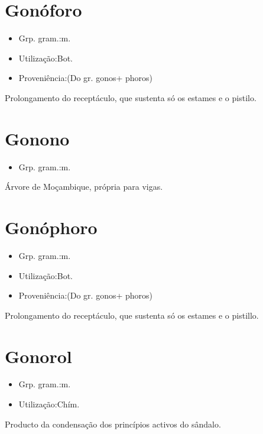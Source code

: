 \section{Gonóforo}
\begin{itemize}
\item {Grp. gram.:m.}
\end{itemize}
\begin{itemize}
\item {Utilização:Bot.}
\end{itemize}
\begin{itemize}
\item {Proveniência:(Do gr. \textunderscore gonos\textunderscore  + \textunderscore phoros\textunderscore )}
\end{itemize}
Prolongamento do receptáculo, que sustenta só os estames e o pistilo.
\section{Gonono}
\begin{itemize}
\item {Grp. gram.:m.}
\end{itemize}
Árvore de Moçambique, própria para vigas.
\section{Gonóphoro}
\begin{itemize}
\item {Grp. gram.:m.}
\end{itemize}
\begin{itemize}
\item {Utilização:Bot.}
\end{itemize}
\begin{itemize}
\item {Proveniência:(Do gr. \textunderscore gonos\textunderscore  + \textunderscore phoros\textunderscore )}
\end{itemize}
Prolongamento do receptáculo, que sustenta só os estames e o pistillo.
\section{Gonorol}
\begin{itemize}
\item {Grp. gram.:m.}
\end{itemize}
\begin{itemize}
\item {Utilização:Chím.}
\end{itemize}
Producto da condensação dos princípios activos do sândalo.
